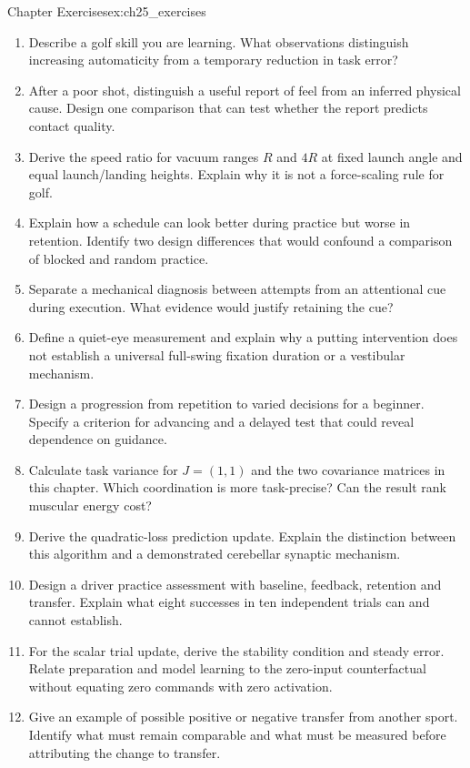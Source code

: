 \begin{exercises}{Chapter Exercises}{ex:ch25_exercises}
\begin{enumerate}
\item Describe a golf skill you are learning. What observations distinguish increasing automaticity from a temporary reduction in task error?
\item After a poor shot, distinguish a useful report of feel from an inferred physical cause. Design one comparison that can test whether the report predicts contact quality.
\item Derive the speed ratio for vacuum ranges $R$ and $4R$ at fixed launch angle and equal launch/landing heights. Explain why it is not a force-scaling rule for golf.
\item Explain how a schedule can look better during practice but worse in retention. Identify two design differences that would confound a comparison of blocked and random practice.
\item Separate a mechanical diagnosis between attempts from an attentional cue during execution. What evidence would justify retaining the cue?
\item Define a quiet-eye measurement and explain why a putting intervention does not establish a universal full-swing fixation duration or a vestibular mechanism.
\item Design a progression from repetition to varied decisions for a beginner. Specify a criterion for advancing and a delayed test that could reveal dependence on guidance.
\item Calculate task variance for $J=(1,1)$ and the two covariance matrices in this chapter. Which coordination is more task-precise? Can the result rank muscular energy cost?
\item Derive the quadratic-loss prediction update. Explain the distinction between this algorithm and a demonstrated cerebellar synaptic mechanism.
\item Design a driver practice assessment with baseline, feedback, retention and transfer. Explain what eight successes in ten independent trials can and cannot establish.
\item For the scalar trial update, derive the stability condition and steady error. Relate preparation and model learning to the zero-input counterfactual without equating zero commands with zero activation.
\item Give an example of possible positive or negative transfer from another sport. Identify what must remain comparable and what must be measured before attributing the change to transfer.
\end{enumerate}
\end{exercises}

